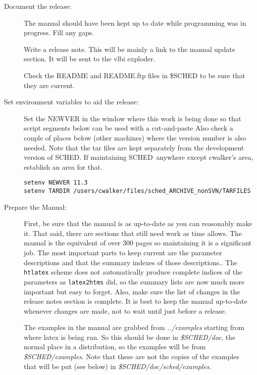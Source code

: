 \documentclass{report}
\newcommand{\sched}{{\sc SCHED}}
\newcommand{\schedb}{{\sc SCHED~}}
\begin{document}
\begin{description}
\item [Document the release:]

The manual should have been kept up to date while programming was in
progress.  Fill any gaps.

Write a release note.  This will be mainly a link to the manual
update section.  It will be sent to the vlbi exploder.

Check the README and README.ftp files in \$SCHED to be sure that
they are current.

      
\item [Set environment variables to aid the release:]

Set the NEWVER in the window where this work is being done so
that script segments below can be used with a cut-and-paste
Also check a couple of places below (other machines) where the
version number is also needed.  Note that the tar files are 
kept separately from the development version of \sched.  
If maintaining \schedb anywhere except cwalker's area, establish an
area for that.

\begin{verbatim}
setenv NEWVER 11.3
setenv TARDIR /users/cwalker/files/sched_ARCHIVE_nonSVN/TARFILES
\end{verbatim}

\item [Prepare the Manual:]

First, be sure that the manual is as up-to-date as you can reasonably
make it.  That said, there are sections that still need work as time
allows.  The manual is the equivalent of over 300 pages so maintaining
it is a significant job.  The most important parts to keep current are
the parameter descriptions and that the summary indexes of those
descriptions..  The {\tt htlatex} scheme does not automatically
produce complete indices of the parameters as {\tt latex2htms} did, so
the summary lists are now much more important but easy to forget.
Also, make sure the list of changes in the release notes section is
complete.  It is best to keep the manual up-to-date whenever changes
are made, not to wait until just before a release.

The examples in the manual are grabbed from {\sl ../examples} starting
from where latex is being run.  So this should be done in {\sl
\$SCHED/doc}, the normal place in a distribution, so the examples will
be from {\sl \$SCHED/examples}.  Note that these are not the copies of
the examples that will be put (see below) in {\sl
\$SCHED/doc/sched/examples}.


\end{description}
\end{document}
